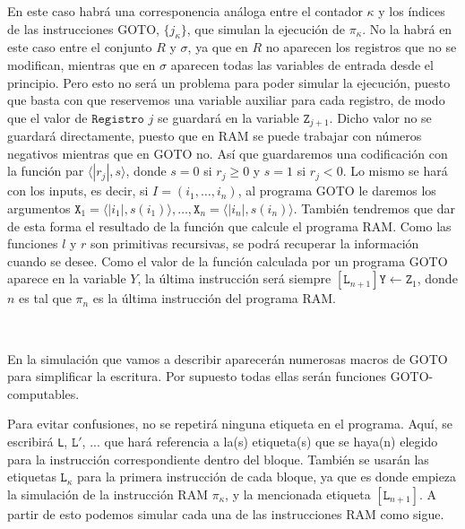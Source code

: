 \documentclass[twoside]{article}
\begin{document}
En este caso habrá una corresponencia análoga entre el contador $\kappa$ y los índices de las instrucciones GOTO, $\{j_\kappa\}$, que simulan la ejecución de $\pi_\kappa$. No la habrá en este caso entre el conjunto $R$ y $\sigma$, ya que en $R$ no aparecen los registros que no se modifican, mientras que en $\sigma$ aparecen todas las variables de entrada desde el principio. Pero esto no será un problema para poder simular la ejecución, puesto que basta con que reservemos una variable auxiliar para cada registro, de modo que el valor de $\texttt{Registro }j$ se guardará en la variable $\texttt{Z}_{j+1}$. Dicho valor no se guardará directamente, puesto que en RAM se puede trabajar con números negativos mientras que en GOTO no. Así que guardaremos una codificación con la función par $\langle |r_j|,s\rangle$, donde $s=0$ si $r_j\geq 0$ y $s=1$ si $r_j< 0$. Lo mismo se hará con los inputs, es decir, si $I=(i_1,\dots, i_n)$, al programa GOTO le daremos los argumentos $\texttt{X}_1=\langle |i_1|,s(i_1)\rangle,\dots,\texttt{X}_n=\langle |i_n|,s(i_n)\rangle$. También tendremos que dar de esta forma el resultado de la función que calcule el programa RAM. Como las funciones $l$ y $r$ son primitivas recursivas, se podrá recuperar la información cuando se desee. Como el valor de la función calculada por un programa GOTO aparece en la variable $Y$, la última instrucción será siempre $[\texttt{L}_{n+1}]\texttt{Y}\leftarrow\texttt{Z}_1$, donde $n$ es tal que $\pi_n$ es la última instrucción del programa RAM.

\

En la simulación que vamos a describir aparecerán numerosas macros de GOTO para simplificar la escritura. Por supuesto todas ellas serán funciones GOTO-computables. 

Para evitar confusiones, no se repetirá ninguna etiqueta en el programa. Aquí, se escribirá \texttt{L}, $\texttt{L}'$, ... que hará referencia a la(s) etiqueta(s) que se haya(n) elegido para la instrucción correspondiente dentro del bloque. También se usarán las etiquetas $\texttt{L}_\kappa$ para la primera instrucción de cada bloque, ya que es donde empieza la simulación de la instrucción RAM $\pi_\kappa$, y la mencionada etiqueta $[\texttt{L}_{n+1}]$. A partir de esto podemos simular cada una de las instrucciones RAM como sigue. 
\end{document}
